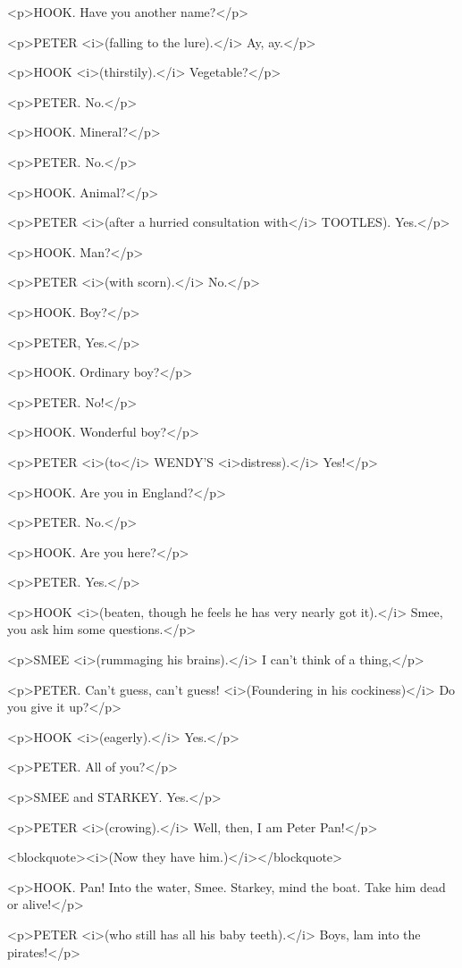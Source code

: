 <p>HOOK. Have you another name?</p>

<p>PETER <i>(falling to the lure).</i> Ay, ay.</p>

<p>HOOK <i>(thirstily).</i> Vegetable?</p>

<p>PETER. No.</p>

<p>HOOK. Mineral?</p>

<p>PETER. No.</p>

<p>HOOK. Animal?</p>

<p>PETER <i>(after a hurried consultation with</i> TOOTLES). Yes.</p>

<p>HOOK. Man?</p>

<p>PETER <i>(with scorn).</i> No.</p>

<p>HOOK. Boy?</p>

<p>PETER, Yes.</p>

<p>HOOK. Ordinary boy?</p>

<p>PETER. No!</p>

<p>HOOK. Wonderful boy?</p>

<p>PETER <i>(to</i> WENDY'S <i>distress).</i> Yes!</p>

<p>HOOK. Are you in England?</p>

<p>PETER. No.</p>

<p>HOOK. Are you here?</p>

<p>PETER. Yes.</p>

<p>HOOK <i>(beaten, though he feels he has very nearly got it).</i> Smee, you ask him some questions.</p>

<p>SMEE <i>(rummaging his brains).</i> I can't think of a thing,</p>

<p>PETER. Can't guess, can't guess! <i>(Foundering in his cockiness)</i> Do you give it up?</p>

<p>HOOK <i>(eagerly).</i> Yes.</p>

<p>PETER. All of you?</p>

<p>SMEE and STARKEY. Yes.</p>

<p>PETER <i>(crowing).</i> Well, then, I am Peter Pan!</p>

<blockquote><i>(Now they have him.)</i></blockquote>

<p>HOOK. Pan! Into the water, Smee. Starkey, mind the boat. Take him dead or alive!</p>

<p>PETER <i>(who still has all his baby teeth).</i> Boys, lam into the pirates!</p>

